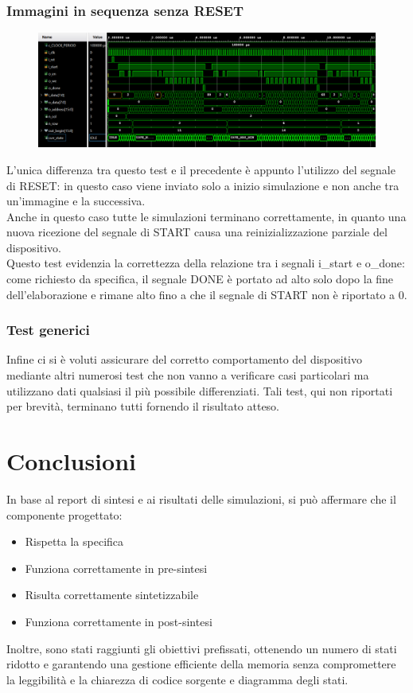 \documentclass[a4paper, 12pt]{article}
\begin{document}
\subsubsection{Immagini in sequenza senza RESET}
\begin{figure}[h]
    \centering
    \includegraphics[trim=0cm 1.25cm 0cm 0.25cm, width=1.0\textwidth]{simulazioni/GEN_NO_RESET.png}
    \label{fig:gen_no_reset}
\end{figure}
L'unica differenza tra questo test e il precedente è appunto l'utilizzo del segnale di  RESET: in questo caso viene inviato solo a inizio simulazione e non anche tra un'immagine e la successiva. \\
Anche in questo caso tutte le simulazioni terminano correttamente, in quanto una nuova ricezione del segnale di START causa una reinizializzazione parziale del dispositivo. \\
Questo test evidenzia la correttezza della relazione tra i segnali i\_start e o\_done: come richiesto da specifica, il segnale DONE è portato ad alto solo dopo la fine dell'elaborazione e rimane alto fino a che il segnale di START non è riportato a 0.

\subsubsection{Test generici}
Infine ci si è voluti assicurare del corretto comportamento del dispositivo mediante altri numerosi test che non vanno a verificare casi particolari ma utilizzano dati qualsiasi il più possibile differenziati. Tali test, qui non riportati per brevità, terminano tutti fornendo il risultato atteso.

\newpage
\section{Conclusioni}
In base al report di sintesi e ai risultati delle simulazioni, si può affermare che il componente progettato:
\begin{itemize}
    \item Rispetta la specifica
    \item Funziona correttamente in pre-sintesi
    \item Risulta correttamente sintetizzabile
    \item Funziona correttamente in post-sintesi
\end{itemize}
Inoltre, sono stati raggiunti gli obiettivi prefissati, ottenendo un numero di stati ridotto e garantendo una gestione efficiente della memoria senza compromettere la leggibilità e la chiarezza di codice sorgente e diagramma degli stati.
\end{document}
